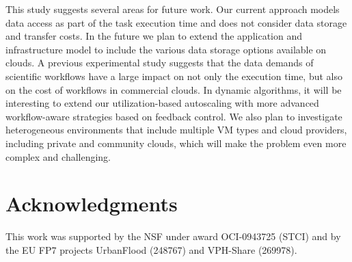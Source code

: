 \documentclass[conference]{IEEEtran}
\begin{document}

This study suggests several areas for future work. Our current approach models
data access as part of the task execution time and does not consider data
storage and transfer costs. In the future we plan to extend the application
and infrastructure model to  include the various data storage options
available on clouds. A previous experimental study \cite{Juve2010} suggests
that the data demands of scientific workflows have a large impact on not only
the execution time, but also on the cost of workflows in commercial clouds. 
In dynamic algorithms, it will be interesting to extend our
utilization-based autoscaling with more advanced workflow-aware strategies
based on feedback control.
We also plan to investigate heterogeneous environments that include multiple VM
types and cloud providers, including private and community clouds, which will
make the problem even more complex and challenging.




\section*{Acknowledgments}
This work was supported by the NSF under award OCI-0943725 (STCI) and
by the EU FP7 projects UrbanFlood (248767) and VPH-Share (269978).

%







\end{document}
